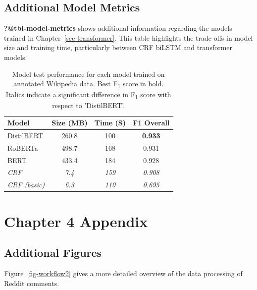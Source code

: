 \documentclass[
  letterpaper,
  11pt,
  english,
  onehalfspacing,
  headsepline]{MastersDoctoralThesis}
\begin{document}
\hypertarget{additional-model-metrics}{%
\section{Additional Model Metrics}\label{additional-model-metrics}}

\textbf{?@tbl-model-metrics} shows additional information regarding the
models trained in Chapter~\ref{sec-transformer}. This table highlights
the trade-offs in model size and training time, particularly between CRF
biLSTM and transformer models.

\begin{table}
    \centering
    \caption{Model test performance for each model trained on annotated Wikipedia data. Best F\textsubscript{1} score in bold. Italics indicate a significant difference in F\textsubscript{1} score with respect to 'DistilBERT'. \label{tbl-model-metrics}}
    \fontsize{9}{11}\selectfont
    \begin{tabular}[t]{lccc}
    \toprule
        \textbf{Model} & \textbf{Size (MB)} & \textbf{Time (S)} & \textbf{F1 Overall} \\
    \midrule
        DistilBERT & 260.8 & 100 & \textbf{0.933} \\
        RoBERTa & 498.7 & 168 & 0.931 \\
        BERT & 433.4 & 184 & 0.928 \\
        \textit{CRF} & \textit{7.4} & \textit{159} & \textit{0.908} \\
        \textit{CRF (basic)} & \textit{6.3} & \textit{110} & \textit{0.695} \\
    \bottomrule
    \end{tabular}
\end{table}

\hypertarget{chapter-4-appendix}{%
\chapter{Chapter 4 Appendix}\label{chapter-4-appendix}}

\hypertarget{additional-figures}{%
\section{Additional Figures}\label{additional-figures}}

Figure~\ref{fig-workflow2} gives a more detailed overview of the data
processing of Reddit comments.
\end{document}
